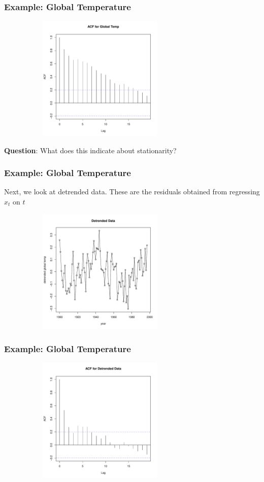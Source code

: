 \documentclass[%
xcolor=pdftex]{beamer}
\begin{document}
\begin{frame}
\frametitle{Example: Global Temperature}

\includegraphics[width=100mm, height=60mm]{pics/acf1.pdf}

\textbf{Question}: What does this indicate about stationarity?

\end{frame}

\begin{frame}
\frametitle{Example: Global Temperature}

Next, we look at detrended data. These are the residuals obtained from regressing $x_t$ on $t$

\includegraphics[width=100mm, height=60mm]{pics/plots2.pdf}

\end{frame}

\begin{frame}
\frametitle{Example: Global Temperature}

\includegraphics[width=100mm, height=60mm]{pics/acf2.pdf}

\end{frame}
\end{document}
